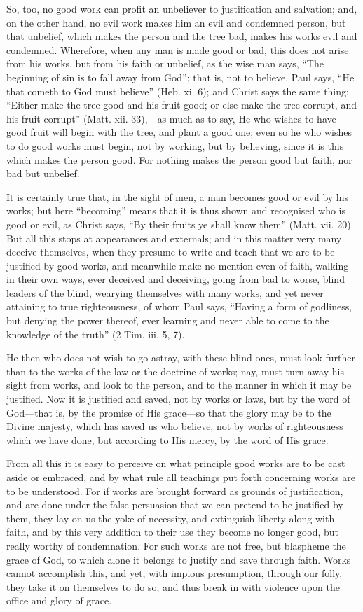 So, too, no good work can profit an unbeliever to justification and
salvation; and, on the other hand, no evil work makes him an evil and
condemned person, but that unbelief, which makes the person and the tree
bad, makes his works evil and condemned. Wherefore, when any man is made
good or bad, this does not arise from his works, but from his faith or
unbelief, as the wise man says, ``The beginning of sin is to fall away from
God''; that is, not to believe. Paul says, ``He that cometh to God must
believe'' (Heb. xi. 6); and Christ says the same thing: ``Either make the
tree good and his fruit good; or else make the tree corrupt, and his fruit
corrupt'' (Matt. xii. 33),—as much as to say, He who wishes to have
good fruit will begin with the tree, and plant a good one; even so he who
wishes to do good works must begin, not by working, but by believing,
since it is this which makes the person good. For nothing makes the person
good but faith, nor bad but unbelief.

It is certainly true that, in the sight of men, a man becomes good or evil
by his works; but here ``becoming'' means that it is thus shown and
recognised who is good or evil, as Christ says, ``By their fruits ye shall
know them'' (Matt. vii. 20). But all this stops at appearances and
externals; and in this matter very many deceive themselves, when they
presume to write and teach that we are to be justified by good works, and
meanwhile make no mention even of faith, walking in their own ways, ever
deceived and deceiving, going from bad to worse, blind leaders of the
blind, wearying themselves with many works, and yet never attaining to
true righteousness, of whom Paul says, ``Having a form of godliness, but
denying the power thereof, ever learning and never able to come to the
knowledge of the truth'' (2 Tim. iii. 5, 7).

He then who does not wish to go astray, with these blind ones, must look
further than to the works of the law or the doctrine of works; nay, must
turn away his sight from works, and look to the person, and to the manner
in which it may be justified. Now it is justified and saved, not by works
or laws, but by the word of God—that is, by the promise of His grace—so
that the glory may be to the Divine majesty, which has saved us who
believe, not by works of righteousness which we have done, but according
to His mercy, by the word of His grace.

From all this it is easy to perceive on what principle good works are to
be cast aside or embraced, and by what rule all teachings put forth
concerning works are to be understood. For if works are brought forward as
grounds of justification, and are done under the false persuasion that we
can pretend to be justified by them, they lay on us the yoke of necessity,
and extinguish liberty along with faith, and by this very addition to
their use they become no longer good, but really worthy of condemnation.
For such works are not free, but blaspheme the grace of God, to which
alone it belongs to justify and save through faith. Works cannot
accomplish this, and yet, with impious presumption, through our folly,
they take it on themselves to do so; and thus break in with violence upon
the office and glory of grace.

